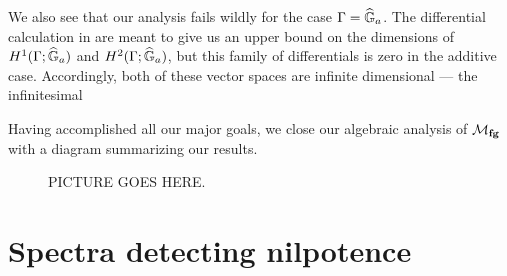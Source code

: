 \begin{remark}
We also see that our analysis fails wildly for the case $\Gamma = \widehat{\mathbb G}_a$.  The differential calculation in  are meant to give us an upper bound on the dimensions of $H^1(\Gamma; \widehat{\mathbb G}_a)$ and $H^2(\Gamma; \widehat{\mathbb G}_a)$, but this family of differentials is zero in the additive case.  Accordingly, both of these vector spaces are infinite dimensional --- the infinitesimal
\end{remark}


Having accomplished all our major goals, we close our algebraic analysis of $\mathcal{M}_{\mathbf{fg}}$ with a diagram summarizing our results.
\begin{landscape}
\begin{figure}[b]
PICTURE GOES HERE.
\end{figure}
\end{landscape}








\section{Spectra detecting nilpotence}

